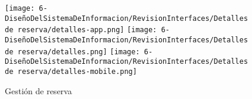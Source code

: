 \begin{figure}[H]
	\centering
	\texttt{[image: 6-DiseñoDelSistemaDeInformacion/RevisionInterfaces/Detalles de reserva/detalles-app.png]}
	\texttt{[image: 6-DiseñoDelSistemaDeInformacion/RevisionInterfaces/Detalles de reserva/detalles.png]}
	\texttt{[image: 6-DiseñoDelSistemaDeInformacion/RevisionInterfaces/Detalles de reserva/detalles-mobile.png]}
	\caption{Gestión de reserva}
\end{figure}